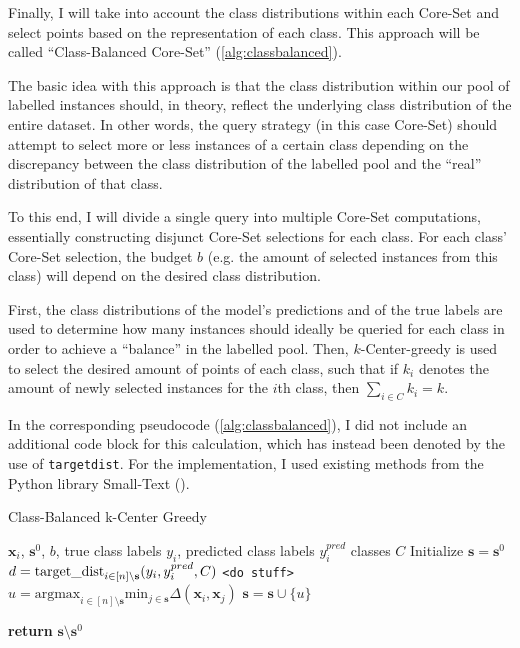 \documentclass[english,bachelor,ul]{webisthesis} %
\begin{document}
Finally, I will take into account the class distributions within each Core-Set and select points based on the representation of each class. This approach will be called ``Class-Balanced Core-Set'' (\ref{alg:classbalanced}).

The basic idea with this approach is that the class distribution within our pool of labelled instances should, in theory, reflect the underlying class distribution of the entire dataset. In other words, the query strategy (in this case Core-Set) should attempt to select more or less instances of a certain class depending on the discrepancy between the class distribution of the labelled pool and the ``real'' distribution of that class.

To this end, I will divide a single query into multiple Core-Set computations, essentially constructing disjunct Core-Set selections for each class. For each class' Core-Set selection, the budget $ b $ (e.g. the amount of selected instances from this class) will depend on the desired class distribution.

First, the class distributions of the model's predictions and of the true labels are used to determine how many instances should ideally be queried for each class in order to achieve a ``balance'' in the labelled pool. Then, $k$-Center-greedy is used to select the desired amount of points of each class, such that if $ k_i $ denotes the amount of newly selected instances for the $ i $th class, then $ \sum_{i \in C} k_i = k $. 

In the corresponding pseudocode (\ref{alg:classbalanced}), I did not include an additional code block for this calculation, which has instead been denoted by the use of \texttt{target\textunderscore dist}. For the implementation, I used existing methods from the Python library Small-Text (\cite{schroeder2023small-text}).

\begin{algorithm}
    \caption{Class-Balanced k-Center Greedy}%
\makeatletter{}\makeatother
\label{alg:classbalanced}
\begin{algorithmic}

\Require $ \mathbf{x}_i $, $ \mathbf{s}^0 $, $ b $, true class labels $ y_i $, predicted class labels $ y^{pred}_i $ classes $ C $
\State Initialize $ \mathbf{s} = \mathbf{s}^0 $
\State $ d = \text{target\textunderscore dist}_{i \in [n] \setminus \mathbf{s}} (y_i, y^{pred}_i, C) $
\State \texttt{<do stuff>}
\EndFor
\Repeat
\State $ u = \text{argmax}_{i \in [n] \setminus \mathbf{s}} \text{min}_{j \in \mathbf{s}} \Delta(\mathbf{x}_i, \mathbf{x}_j) $
\State $ \mathbf{s} = \mathbf{s} \cup \{u\} $

\State \textbf{return} $\mathbf{s} \setminus \mathbf{s}^0 $
\end{algorithmic}
\end{algorithm}
\end{document}
